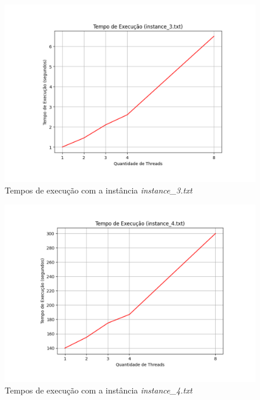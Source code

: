 \documentclass[a4paper, 12pt]{article}
\begin{document}
\begin{figure}[H]
    \centering
    \includegraphics[width=1\textwidth]{Images/instance_3.pdf}
    \vspace*{-1.5cm}
    \caption{Tempos de execução com a instância \emph{instance\_3.txt}}
    \label{fig:map4}
\end{figure}

\begin{figure}[H]
    \centering
    \includegraphics[width=1\textwidth]{Images/instance_4.pdf}
    \vspace*{-1.5cm}
    \caption{Tempos de execução com a instância \emph{instance\_4.txt}}
    \label{fig:map5}
\end{figure}
\end{document}
